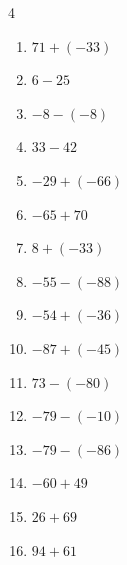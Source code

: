\begin{multicols}{4}
\begin{enumerate}
  \item $71+(-33)$

        \phantom{$=38$}

  \item $6-25$

        \phantom{$=-19$}

  \item $-8-(-8)$

        \phantom{$=0$}

  \item $33-42$

        \phantom{$=-9$}

  \item $-29+(-66)$

        \phantom{$=-95$}

  \item $-65+70$

        \phantom{$=5$}

  \item $8+(-33)$

        \phantom{$=-25$}

\columnbreak %

\resetques

  \item $-55-(-88)$

        \phantom{$=33$}

  \item $-54+(-36)$

        \phantom{$=-90$}

  \item $-87+(-45)$

        \phantom{$=-132$}

  \item $73-(-80)$

        \phantom{$=153$}

  \item $-79-(-10)$

        \phantom{$=-69$}

  \item $-79-(-86)$

        \phantom{$=7$}

  \item $-60+49$

        \phantom{$=-11$}

  \item $26+69$

        \phantom{$=95$}

  \item $94+61$


\end{enumerate}
\end{multicols}
